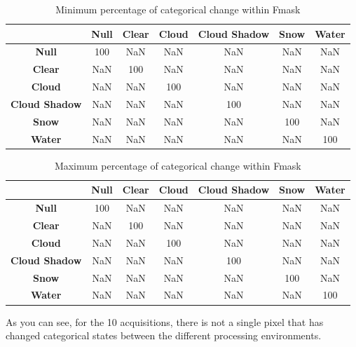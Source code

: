 \documentclass[a4paper]{article}
\begin{document}
    \begin{table}[ht!]
      \caption{Minimum percentage of categorical change within Fmask}\label{table:5}
      \centering
      \begin{tabular}{ccccccc} \midrule
        & \textbf{Null} & \textbf{Clear} & \textbf{Cloud} & \textbf{Cloud Shadow} & \textbf{Snow} & \textbf{Water} \\ \midrule
        \textbf{Null} & 100 & NaN & NaN & NaN & NaN & NaN \\
        \textbf{Clear} & NaN & 100 & NaN & NaN & NaN & NaN \\
        \textbf{Cloud} & NaN & NaN & 100 & NaN & NaN & NaN \\
        \textbf{Cloud Shadow} & NaN & NaN & NaN & 100 & NaN & NaN \\
        \textbf{Snow} & NaN & NaN & NaN & NaN & 100 & NaN \\
        \textbf{Water} & NaN & NaN & NaN & NaN & NaN & 100 \\
      \end{tabular}
    \end{table}

    \begin{table}[ht!]
      \caption{Maximum percentage of categorical change within Fmask}\label{table:6}
      \centering
      \begin{tabular}{ccccccc} \midrule
        & \textbf{Null} & \textbf{Clear} & \textbf{Cloud} & \textbf{Cloud Shadow} & \textbf{Snow} & \textbf{Water} \\ \midrule
        \textbf{Null} & 100 & NaN & NaN & NaN & NaN & NaN \\
        \textbf{Clear} & NaN & 100 & NaN & NaN & NaN & NaN \\
        \textbf{Cloud} & NaN & NaN & 100 & NaN & NaN & NaN \\
        \textbf{Cloud Shadow} & NaN & NaN & NaN & 100 & NaN & NaN \\
        \textbf{Snow} & NaN & NaN & NaN & NaN & 100 & NaN \\
        \textbf{Water} & NaN & NaN & NaN & NaN & NaN & 100 \\
      \end{tabular}
    \end{table}

      \begin{flushleft}
        As you can see, for the 10 acquisitions, there is not a single pixel that has changed categorical states between the different processing environments.
      \end{flushleft}
\end{document}
